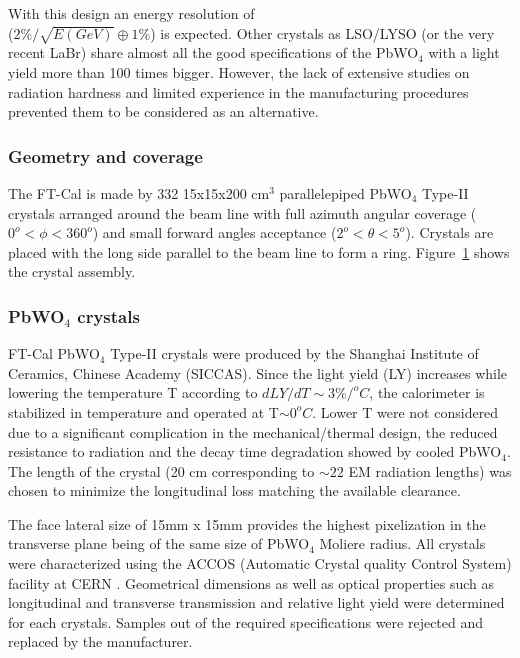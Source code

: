 With this design
 an energy resolution of \\
($2\% /\sqrt{E(GeV)} \oplus 1\%$) is expected.
Other crystals as LSO/LYSO (or the very recent LaBr) share almost all the good specifications of the PbWO$_4$ with a light yield more than 100 times bigger. However, the lack of extensive studies on radiation hardness and limited experience in the manufacturing procedures prevented them to be considered as an alternative.

\begin{figure}[th!]
\centering 
\caption{} 
\label{fig:ft-cal-geometry} 
\end{figure}

\subsubsection{Geometry and coverage}
The FT-Cal is made by 332 15x15x200 cm$^3$ parallelepiped PbWO$_4$ Type-II crystals arranged around the beam line  with full azimuth angular coverage ($0^o<\phi<360^o$)   and small forward angles  acceptance ($2^o<\theta<5^o$). Crystals are placed with the long side parallel to the beam line to form a ring. Figure~\ref{fig:ft-cal-geometry} shows the crystal assembly. 

\subsubsection{PbWO$_4$ crystals}
FT-Cal PbWO$_4$ Type-II crystals were produced by the Shanghai Institute of Ceramics, Chinese Academy (SICCAS). Since the light yield (LY) increases while lowering the temperature T according to $dLY/dT \sim 3\%/^oC$, the calorimeter is stabilized in temperature and operated at T$\sim 0 ^oC$. Lower T were not considered due to a significant complication in the mechanical/thermal design,  the reduced resistance to radiation  and the decay time degradation showed by cooled PbWO$_4$.
The length of the crystal (20 cm corresponding to $\sim22$ EM radiation lengths) was chosen to minimize the longitudinal loss matching the available clearance.

The face lateral size of 15mm x 15mm  provides the highest pixelization in the transverse plane being  of the same size of  PbWO$_4$  Moliere radius.  All crystals were characterized using the ACCOS (Automatic Crystal quality Control System) facility  at CERN \cite{accos}. Geometrical dimensions as well as optical properties such as longitudinal and transverse  transmission and relative light yield were determined for each crystals. Samples out of the required specifications were rejected and replaced by the manufacturer. 

